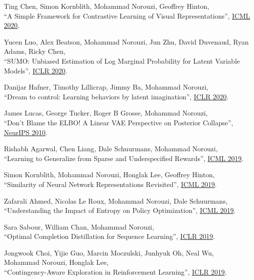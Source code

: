 \documentclass[10pt,letterpaper]{article}
\renewenvironment{itemize}{
  \begin{list}{}{
    \setlength{\leftmargin}{1.5em}
  }
}{
  \end{list}
}
\begin{document}
\begin{itemize}
\item Ting Chen, Simon Kornblith, Mohammad Norouzi, Geoffrey Hinton,\\
``A Simple Framework for Contrastive Learning of Visual Representations'',
\href{https://arxiv.org/pdf/2002.05709}{ICML 2020}.

\item Yucen Luo, Alex Beatson, Mohammad Norouzi, Jun Zhu, David Duvenaud, Ryan Adams, Ricky Chen,\\
``SUMO: Unbiased Estimation of Log Marginal Probability for Latent Variable Models'',
\href{https://arxiv.org/pdf/2004.00353}{ICLR 2020}.

\item Danijar Hafner, Timothy Lillicrap, Jimmy Ba, Mohammad Norouzi,\\
``Dream to control: Learning behaviors by latent imagination'',  
\href{https://arxiv.org/pdf/1912.01603}{ICLR 2020}.


\item James Lucas, George Tucker, Roger B Grosse, Mohammad Norouzi,\\
``Don't Blame the ELBO! A Linear VAE Perspective on Posterior Collapse'',
\href{https://arxiv.org/pdf/1911.02469.pdf}{NeurIPS 2010}.

\item Rishabh Agarwal, Chen Liang, Dale Schuurmans, Mohammad Norouzi,\\
``Learning to Generalize from Sparse and Underspecified Rewards'',
\href{https://arxiv.org/pdf/1902.07198.pdf}{ICML 2019}.

\item Simon Kornblith, Mohammad Norouzi, Honglak Lee, Geoffrey Hinton,\\
``Similarity of Neural Network Representations Revisited'',
\href{https://arxiv.org/pdf/1905.00414.pdf}{ICML 2019}.

\item Zafarali Ahmed, Nicolas Le Roux, Mohammad Norouzi, Dale Schuurmans,\\
``Understanding the Impact of Entropy on Policy Optimization'',
\href{https://arxiv.org/pdf/1811.11214.pdf}{ICML 2019}.

\item
Sara Sabour, William Chan, Mohammad Norouzi,\\
``Optimal Completion Distillation for Sequence Learning'',
\href{https://arxiv.org/pdf/1810.01398.pdf}{ICLR 2019}.

\item
Jongwook Choi, Yijie Guo, Marcin Moczulski, Junhyuk Oh, Neal Wu, Mohammad Norouzi, Honglak Lee,\\
``Contingency-Aware Exploration in Reinforcement Learning'',
\href{https://arxiv.org/pdf/1811.01483.pdf}{ICLR 2019}.



\end{itemize}
\end{document}
